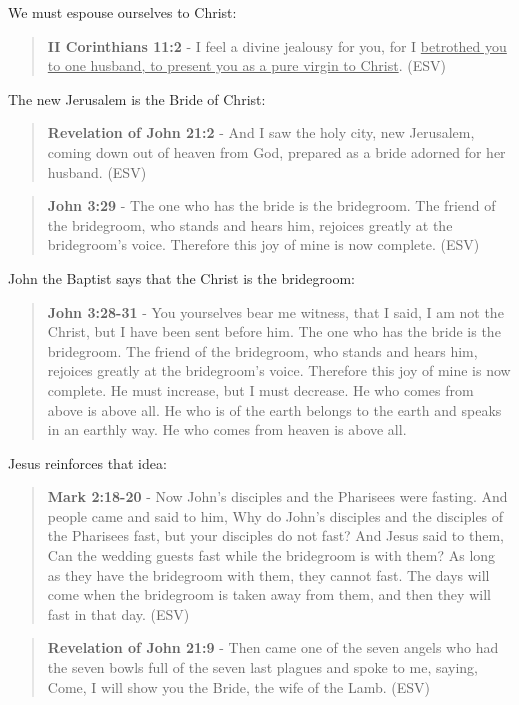 \documentclass[11pt]{article}
\begin{document}
We must espouse ourselves to Christ:

\begin{quote}
\textbf{II Corinthians 11:2} - I feel a divine jealousy for you, for I \uline{betrothed you to one husband, to present you as a pure virgin to Christ}. (ESV)
\end{quote}

The new Jerusalem is the Bride of Christ:

\begin{quote}
\textbf{Revelation of John 21:2} - And I saw the holy city, new Jerusalem, coming down out of heaven from God, prepared as a bride adorned for her husband. (ESV)
\end{quote}

\begin{quote}
\textbf{John 3:29} - The one who has the bride is the bridegroom. The friend of the bridegroom, who stands and hears him, rejoices greatly at the bridegroom's voice. Therefore this joy of mine is now complete. (ESV)
\end{quote}

John the Baptist says that the Christ is the bridegroom:

\begin{quote}
\textbf{John 3:28-31} - You yourselves bear me witness, that I said, I am not the Christ, but I have been sent before him. The one who has the bride is the bridegroom. The friend of the bridegroom, who stands and hears him, rejoices greatly at the bridegroom's voice. Therefore this joy of mine is now complete. He must increase, but I must decrease. He who comes from above is above all. He who is of the earth belongs to the earth and speaks in an earthly way. He who comes from heaven is above all.
\end{quote}

Jesus reinforces that idea:

\begin{quote}
\textbf{Mark 2:18-20} - Now John's disciples and the Pharisees were fasting. And people came and said to him, Why do John's disciples and the disciples of the Pharisees fast, but your disciples do not fast? And Jesus said to them, Can the wedding guests fast while the bridegroom is with them? As long as they have the bridegroom with them, they cannot fast. The days will come when the bridegroom is taken away from them, and then they will fast in that day. (ESV)
\end{quote}

\begin{quote}
\textbf{Revelation of John 21:9} - Then came one of the seven angels who had the seven bowls full of the seven last plagues and spoke to me, saying, Come, I will show you the Bride, the wife of the Lamb. (ESV)
\end{quote}
\end{document}
